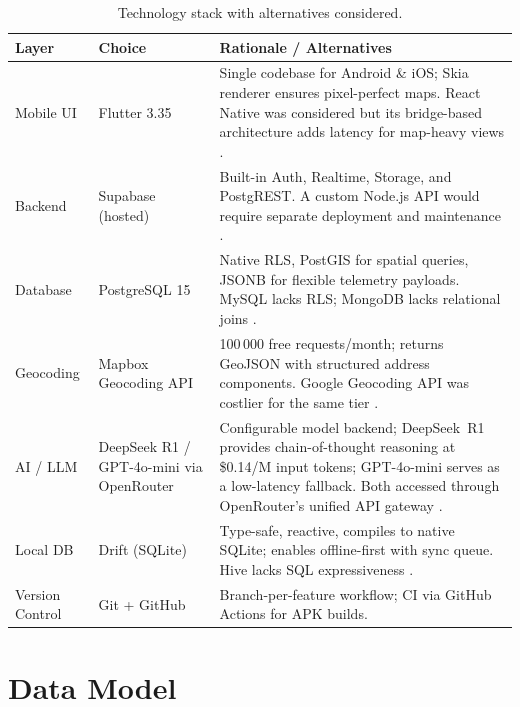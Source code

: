 \begin{table}[ht]
  \centering
  \caption{Technology stack with alternatives considered.}
  \label{tab:tech-stack}
  \small
  \begin{tabularx}{\textwidth}{l l X}
    \toprule
    \textbf{Layer} & \textbf{Choice} & \textbf{Rationale / Alternatives} \\
    \midrule
    Mobile UI
      & Flutter 3.35
      & Single codebase for Android \& iOS; Skia renderer ensures pixel-perfect
        maps.  React Native was considered but its bridge-based architecture
        adds latency for map-heavy views
        \autocite{flutter2026docs}. \\
    Backend
      & Supabase (hosted)
      & Built-in Auth, Realtime, Storage, and PostgREST.  A custom Node.js API
        would require separate deployment and maintenance
        \autocite{supabase2026docs}. \\
    Database
      & PostgreSQL 15
      & Native RLS, PostGIS for spatial queries, JSONB for flexible telemetry
        payloads.  MySQL lacks RLS; MongoDB lacks relational joins
        \autocite{postgresql2026rls}. \\
    Geocoding
      & Mapbox Geocoding API
      & 100\,000 free requests/month; returns GeoJSON with structured address
        components.  Google Geocoding API was costlier for the same tier
        \autocite{mapbox2026geocoding}. \\
    AI / LLM
      & DeepSeek R1 / GPT-4o-mini via OpenRouter
      & Configurable model backend; DeepSeek~R1 provides chain-of-thought
        reasoning at \$0.14/M input tokens; GPT-4o-mini serves as a
        low-latency fallback.  Both accessed through OpenRouter's unified
        API gateway \autocite{deepseek2025r1,openrouter2026docs}. \\
    Local DB
      & Drift (SQLite)
      & Type-safe, reactive, compiles to native SQLite; enables offline-first
        with sync queue.  Hive lacks SQL expressiveness
        \autocite{drift2026docs}. \\
    Version Control
      & Git + GitHub
      & Branch-per-feature workflow; CI via GitHub Actions for APK builds. \\
    \bottomrule
  \end{tabularx}
\end{table}

\section{Data Model}
\label{sec:data-model}

